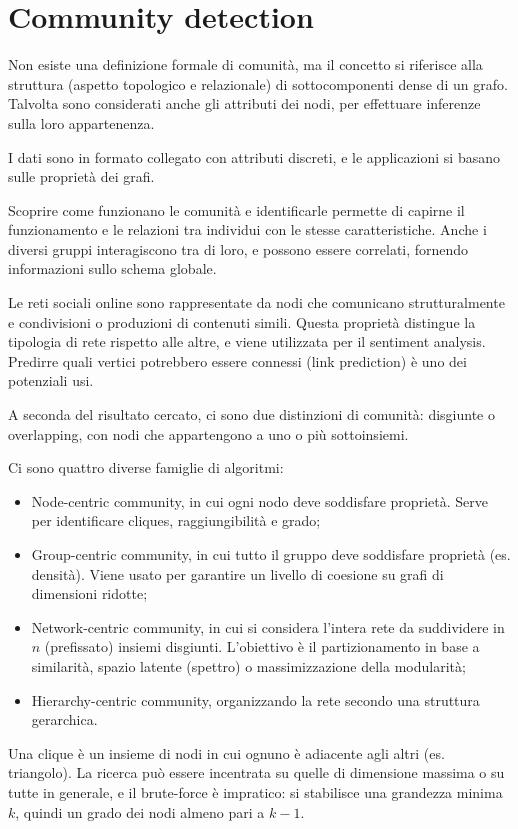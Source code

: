 \section{Community detection}
Non esiste una definizione formale di comunità, ma il concetto si riferisce alla struttura (aspetto topologico e relazionale) di sottocomponenti dense di un grafo. Talvolta sono considerati anche gli attributi dei nodi, per effettuare inferenze sulla loro appartenenza.

I dati sono in formato collegato con attributi discreti, e le applicazioni si basano sulle proprietà dei grafi.

Scoprire come funzionano le comunità e identificarle permette di capirne il funzionamento e le relazioni tra individui con le stesse caratteristiche. Anche i diversi gruppi interagiscono tra di loro, e possono essere correlati, fornendo informazioni sullo schema globale.

Le reti sociali online sono rappresentate da nodi che comunicano strutturalmente e condivisioni o produzioni di contenuti simili. Questa proprietà distingue la tipologia di rete rispetto alle altre, e viene utilizzata per il sentiment analysis. Predirre quali vertici potrebbero essere connessi (link prediction) è uno dei potenziali usi.

A seconda del risultato cercato, ci sono due distinzioni di comunità: disgiunte o overlapping, con nodi che appartengono a uno o più sottoinsiemi.

Ci sono quattro diverse famiglie di algoritmi:
\begin{itemize}
	\item Node-centric community, in cui ogni nodo deve soddisfare proprietà. Serve per identificare cliques, raggiungibilità e grado;
	\item Group-centric community, in cui tutto il gruppo deve soddisfare proprietà (es. densità). Viene usato per garantire un livello di coesione su grafi di dimensioni ridotte;
	\item Network-centric community, in cui si considera l'intera rete da suddividere in $n$ (prefissato) insiemi disgiunti. L'obiettivo è il partizionamento in base a similarità, spazio latente (spettro) o massimizzazione della modularità;
	\item Hierarchy-centric community, organizzando la rete secondo una struttura gerarchica.
\end{itemize}
Una clique è un insieme di nodi in cui ognuno è adiacente agli altri (es. triangolo). La ricerca può essere incentrata su quelle di dimensione massima o su tutte in generale, e il brute-force è impratico: si stabilisce una grandezza minima $k$, quindi un grado dei nodi almeno pari a $k - 1$. 


